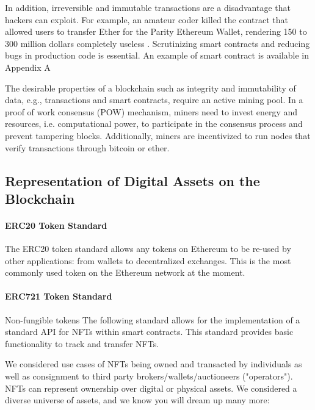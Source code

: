 \documentclass[12pt,tightenlines,letterpaper]{scrartcl}
\begin{document}
		In addition, irreversible and immutable transactions are a disadvantage that hackers can exploit. For example, an amateur coder killed the contract that allowed users to transfer Ether for the Parity \gls{Ethereum} Wallet, rendering 150 to 300 million dollars completely useless \cite{funnyJoke:Online}. Scrutinizing smart contracts and reducing bugs in production code is essential. An example of smart contract is available in Appendix A%
		
		The desirable properties of a \gls{blockchain} such as integrity and immutability of data, e.g., transactions and
		smart contracts, require an active mining pool. In a proof of work consensus (POW) mechanism,  miners need to invest energy and resources,
		i.e. computational power, to participate in the consensus process and prevent tampering blocks. Additionally, miners are incentivized to run nodes that verify transactions through bitcoin or ether. %
	
\subsection{Representation of Digital Assets on the Blockchain}

\paragraph{ERC20 Token Standard}

The ERC20 token standard allows any tokens on Ethereum to be re-used by other applications: from wallets to decentralized exchanges. This is the most commonly used token on the Ethereum network at the moment.


\paragraph{ERC721 Token Standard}

Non-fungible tokens
The following standard allows for the implementation of a standard API for NFTs within smart contracts. This standard provides basic functionality to track and transfer NFTs.

We considered use cases of NFTs being owned and transacted by individuals as well as consignment to third party brokers/wallets/auctioneers ("operators"). NFTs can represent ownership over digital or physical assets. We considered a diverse universe of assets, and we know you will dream up many more:
\end{document}
